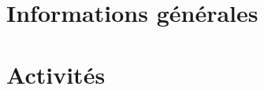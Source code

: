 \mainmatter

\ifbare
\else
\part{Informations générales}


\fi

\part{Activités}


\ifbare
\else

\fi

